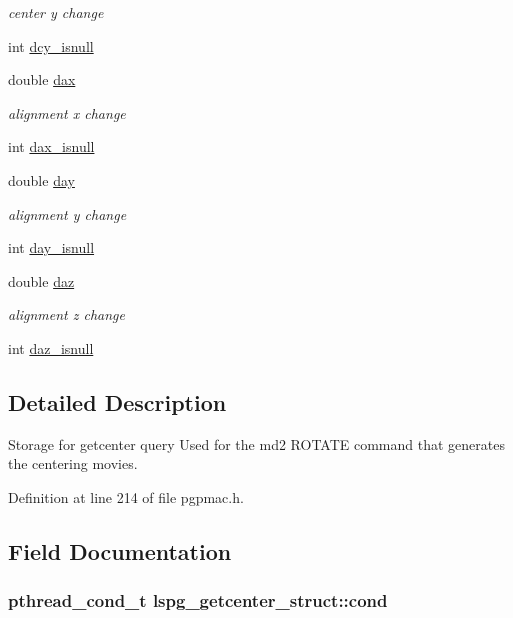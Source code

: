 \begin{DoxyCompactItemize}
\begin{DoxyCompactList}\small\item\em center y change \end{DoxyCompactList}\item 
int \hyperlink{structlspg__getcenter__struct_a352c48c8d443c52f18ebd13019d01684}{dcy\-\_\-isnull}
\item 
double \hyperlink{structlspg__getcenter__struct_a17db52848c28852a470222ec93ae8886}{dax}
\begin{DoxyCompactList}\small\item\em alignment x change \end{DoxyCompactList}\item 
int \hyperlink{structlspg__getcenter__struct_a621b489777d61e9db8b33b784b8d70f9}{dax\-\_\-isnull}
\item 
double \hyperlink{structlspg__getcenter__struct_a9ce0f29540f2ff47be9788565d19f1b8}{day}
\begin{DoxyCompactList}\small\item\em alignment y change \end{DoxyCompactList}\item 
int \hyperlink{structlspg__getcenter__struct_a36f57a319288810caf365cca7827ff96}{day\-\_\-isnull}
\item 
double \hyperlink{structlspg__getcenter__struct_a1170bab2161f03ab29c39f79519ed9ae}{daz}
\begin{DoxyCompactList}\small\item\em alignment z change \end{DoxyCompactList}\item 
int \hyperlink{structlspg__getcenter__struct_a36742b6bd0f4bf9356414930ba893617}{daz\-\_\-isnull}
\end{DoxyCompactItemize}


\subsection{Detailed Description}
Storage for getcenter query Used for the md2 R\-O\-T\-A\-T\-E command that generates the centering movies. 

Definition at line 214 of file pgpmac.\-h.



\subsection{Field Documentation}
\hypertarget{structlspg__getcenter__struct_ae0db0ff2608ab5ba3e7c1b4ad3fc0e91}{
\subsubsection[{cond}]{\setlength{\rightskip}{0pt plus 5cm}pthread\-\_\-cond\-\_\-t lspg\-\_\-getcenter\-\_\-struct\-::cond}}\label{structlspg__getcenter__struct_ae0db0ff2608ab5ba3e7c1b4ad3fc0e91}


